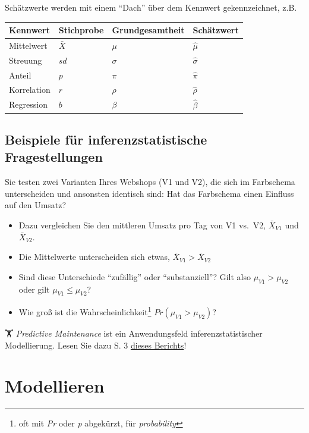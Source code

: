 \documentclass[
  a4paper,
  DIV=11]{scrreprt}
\theoremstyle{definition}
\theoremstyle{remark}
\begin{document}
Schätzwerte werden mit einem ``Dach'' über dem Kennwert gekennzeichnet,
z.B.

\begin{longtable}[]{@{}llll@{}}
\toprule()
Kennwert & Stichprobe & Grundgesamtheit & Schätzwert \\
\midrule()
\endhead
Mittelwert & \(\bar{X}\) & \(\mu\) & \(\hat{\mu}\) \\
Streuung & \(sd\) & \(\sigma\) & \(\hat{\sigma}\) \\
Anteil & \(p\) & \(\pi\) & \(\hat{\pi}\) \\
Korrelation & \(r\) & \(\rho\) & \(\hat{\rho}\) \\
Regression & \(b\) & \(\beta\) & \(\hat{\beta}\) \\
\bottomrule()
\end{longtable}

\hypertarget{beispiele-fuxfcr-inferenzstatistische-fragestellungen}{%
\subsection{Beispiele für inferenzstatistische
Fragestellungen}\label{beispiele-fuxfcr-inferenzstatistische-fragestellungen}}

Sie testen zwei Varianten Ihres Webshops (V1 und V2), die sich im
Farbschema unterscheiden und ansonsten identisch sind: Hat das
Farbschema einen Einfluss auf den Umsatz?

\begin{itemize}
\item
  Dazu vergleichen Sie den mittleren Umsatz pro Tag von V1 vs.~V2,
  \(\bar{X}_{V1}\) und \(\bar{X}_{V2}\).
\item
  Die Mittelwerte unterscheiden sich etwas,
  \(\bar{X}_{V1} > \bar{X}_{V2}\)
\item
  Sind diese Unterschiede ``zufällig'' oder ``substanziell''? Gilt also
  \(\mu_{V1} > \mu_{V2}\) oder gilt \(\mu_{V1} \le \mu_{V2}\)?
\item
  Wie groß ist die Wahrscheinlichkeit\footnote{oft mit \emph{Pr} oder
    \emph{p} abgekürzt, für \emph{probability}}
  \(Pr(\mu_{V1} > \mu_{V2})\)?
\end{itemize}

🏋️ \emph{Predictive Maintenance} ist ein Anwendungsfeld
inferenzstatistischer Modellierung. Lesen Sie dazu S. 3
\href{https://www.rolandberger.com/publications/publication_pdf/roland_berger_vdma_predictive_maintenance_d_1.pdf}{dieses
Berichts}!

\hypertarget{modellieren}{%
\section{Modellieren}\label{modellieren}}
\end{document}
